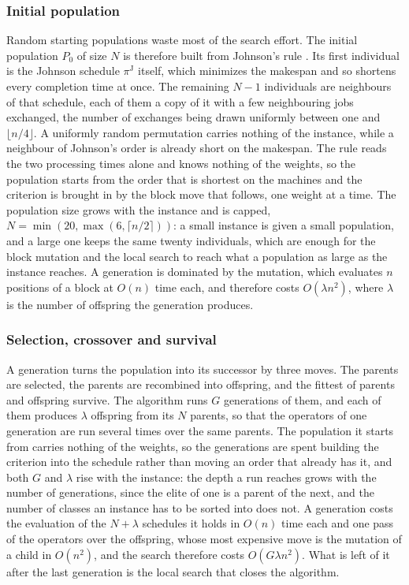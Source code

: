 \documentclass[12pt]{article}
\begin{document}
\begin{sloppypar}
        \subsubsection{Initial population}
        Random starting populations waste most of the search effort.  The initial population $P_0$ of
        size $N$ is therefore built from Johnson's rule \citep{johnson1954optimal}.  Its first
        individual is the Johnson schedule $\pi^{\mathrm{J}}$ itself, which minimizes the makespan and
        so shortens every completion time at once.  The remaining $N-1$ individuals are neighbours of
        that schedule, each of them a copy of it with a few neighbouring jobs exchanged, the number of
        exchanges being drawn uniformly between one and $\lfloor n/4\rfloor$.  A uniformly random
        permutation carries nothing of the instance, while a neighbour of Johnson's order is already
        short on the makespan.  The rule reads the two processing times alone and knows nothing of the
        weights, so the population starts from the order that is shortest on the machines and the
        criterion is brought in by the block move that follows, one weight at a time. The population
        size grows with the instance and is capped, $N=\min(20,\max(6,\lceil n/2\rceil))$:
        a small instance is given a small population, and a large one keeps the same twenty
        individuals, which are enough for the block mutation and the local search to reach what
        a population as large as the instance reaches. A generation is dominated by the mutation,
        which evaluates $n$ positions of a block at $O(n)$ time each, and therefore costs
        $O(\lambda n^{2})$, where $\lambda$ is the number of offspring the generation produces.
        
        \subsubsection{Selection, crossover and survival}
        A generation turns the population into its successor by three moves.  The parents are
        selected, the parents are recombined into offspring, and the fittest of parents and
        offspring survive.  The algorithm runs $G$ generations of them, and each of them produces
        $\lambda$ offspring from its $N$ parents, so that the operators of one generation are run
        several times over the same parents.  The population it starts from carries nothing of the
        weights, so the generations are spent building the criterion into the schedule rather than
        moving an order that already has it, and both $G$ and $\lambda$ rise with the instance: the
        depth a run reaches grows with the number of generations, since the elite of one is a parent
        of the next, and the number of classes an instance has to be sorted into does not.
        A generation costs the evaluation of the $N+\lambda$ schedules it holds in $O(n)$ time each
        and one pass of the operators over the offspring, whose most expensive move is the mutation of
        a child in $O(n^{2})$, and the search therefore costs $O(G\lambda n^{2})$.  What is left of it
        after the last generation is the local search that closes the algorithm.
        

\end{sloppypar}
\end{document}

